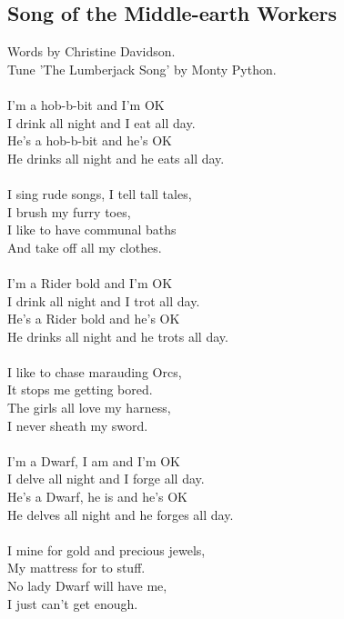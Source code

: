 \begin{multicols}{2}
\section{Song of the Middle-earth Workers}
Words by Christine Davidson.
\\
Tune ’The Lumberjack Song’ by Monty Python.
\\
\\
I’m a hob-b-bit and I’m OK
\\
I drink all night and I eat all day.
\\
He’s a hob-b-bit and he’s OK
\\
He drinks all night and he eats all day.
\\
\\
I sing rude songs, I tell tall tales,
\\
I brush my furry toes,
\\
I like to have communal baths
\\
And take off all my clothes.
\\
\\
I’m a Rider bold and I’m OK
\\
I drink all night and I trot all day.
\\
He’s a Rider bold and he’s OK
\\
He drinks all night and he trots all day.
\\
\\
I like to chase marauding Orcs,
\\
It stops me getting bored.
\\
The girls all love my harness,
\\
I never sheath my sword.
\\
\\
I’m a Dwarf, I am and I’m OK
\\
I delve all night and I forge all day.
\\
He’s a Dwarf, he is and he’s OK
\\
He delves all night and he forges all day.
\\
\\
I mine for gold and precious jewels,
\\
My mattress for to stuff.
\\
No lady Dwarf will have me,
\\
I just can’t get enough.
\\
\\
\\
\\

\end{multicols}
